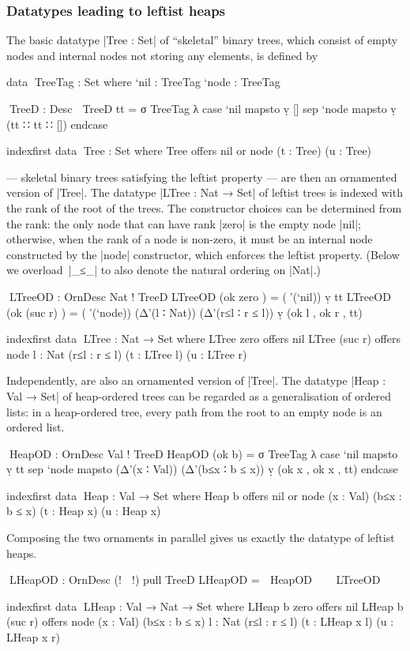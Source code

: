\subsubsection{Datatypes leading to leftist heaps}

The basic datatype |Tree : Set| of ``skeletal'' binary trees, which consist of empty nodes and internal nodes not storing any elements, is defined by
\begin{code}
data ^^^TreeTag : Set where
  `nil   : TreeTag
  `node  : TreeTag

^^^TreeD : Desc ⊤
TreeD tt = σ TreeTag λ  case  `nil   mapsto  ṿ []
                        sep   `node  mapsto  ṿ (tt ∷ tt ∷ []) endcase

indexfirst data ^^^Tree : Set where
  Tree  offers  nil
        or      node (t : Tree) (u : Tree)
\end{code}
 --- skeletal binary trees satisfying the leftist property --- are then an ornamented version of |Tree|.
The datatype |LTree : Nat → Set| of leftist trees is indexed with the rank of the root of the trees.
The constructor choices can be determined from the rank: the only node that can have rank |zero| is the empty node |nil|; otherwise, when the rank of a node is non-zero, it must be an internal node constructed by the |node| constructor, which enforces the leftist property.
(Below we overload~|_≤_| to also denote the natural ordering on |Nat|.)
\begin{code}
^^^LTreeOD : OrnDesc Nat ! TreeD
LTreeOD (ok zero     )   =  (∇'(`nil)) ṿ tt
LTreeOD (ok (suc r)  )   =  (∇'(`node)) (Δ'(l ∶ Nat)) (Δ'(r≤l ∶ r ≤ l)) ṿ (ok l , ok r , tt)

indexfirst data ^^^LTree : Nat → Set where
  LTree zero     offers   nil
  LTree (suc r)  offers   node {l : Nat} (r≤l : r ≤ l) (t : LTree l) (u : LTree r)
\end{code}
Independently,  are also an ornamented version of |Tree|.
The datatype |Heap : Val → Set| of heap-ordered trees can be regarded as a generalisation of ordered lists: in a heap-ordered tree, every path from the root to an empty node is an ordered list.
\begin{code}
^^^HeapOD : OrnDesc Val ! TreeD
HeapOD (ok b) =
  σ TreeTag  λ  case  `nil   mapsto  ṿ tt
                sep   `node  mapsto  (Δ'(x ∶ Val)) (Δ'(b≤x ∶ b ≤ x)) ṿ (ok x , ok x , tt) endcase

indexfirst data ^^^Heap : Val → Set where
  Heap b  offers  nil
          or      node (x : Val) (b≤x : b ≤ x) (t : Heap x) (u : Heap x)
\end{code}
Composing the two ornaments in parallel gives us exactly the datatype of leftist heaps.
\begin{code}
^^^LHeapOD : OrnDesc (! ⋈ !) pull TreeD
LHeapOD = ⌈ HeapOD ⌉ ⊗ ⌈ LTreeOD ⌉

indexfirst data ^^^LHeap : Val → Nat → Set where
  LHeap b zero     offers  nil
  LHeap b (suc r)  offers  node  (x : Val) (b≤x : b ≤ x)
                                 {l : Nat} (r≤l : r ≤ l)
                                 (t : LHeap x l) (u : LHeap x r)
\end{code}

